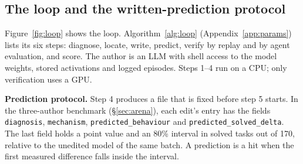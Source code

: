 \subsection{The loop and the written-prediction protocol}
\label{sec:loop}
Figure~\ref{fig:loop} shows the loop. Algorithm~\ref{alg:loop} (Appendix~\ref{app:params}) lists its six steps: diagnose, locate, write, predict, verify by replay and by agent evaluation, and score. The author is an LLM with shell access to the model weights, stored activations and logged episodes. Steps 1--4 run on a CPU; only verification uses a GPU.

\textbf{Prediction protocol.} Step 4 produces a file that is fixed before step 5 starts. In the three-author benchmark (\S\ref{sec:arena}), each edit's entry has the fields \texttt{diagnosis}, \texttt{mechanism}, \texttt{predicted\_behaviour} and \texttt{predicted\_solved\_delta}. The last field holds a point value and an 80\% interval in solved tasks out of 170, relative to the unedited model of the same batch. A prediction is a hit when the first measured difference falls inside the interval.
